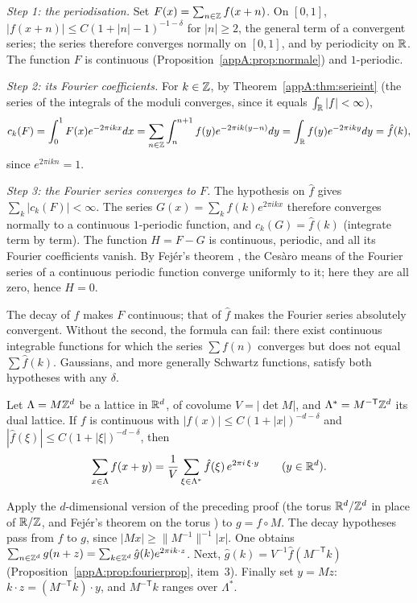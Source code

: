 \begin{humanproof}
\emph{Step 1: the periodisation.} Set $F(x)=\sum_{n\in\mathbb{Z}}f(x+n)$. On $[0,1]$, $|f(x+n)|\le C(1+|n|-1)^{-1-\delta}$
for $|n|\ge2$, the general term of a convergent series; the series therefore converges normally on $[0,1]$, and by
periodicity on $\mathbb{R}$. The function $F$ is continuous (Proposition~\ref{appA:prop:normale}) and $1$-periodic.

\emph{Step 2: its Fourier coefficients.} For $k\in\mathbb{Z}$, by Theorem~\ref{appA:thm:serieint} (the series of the
integrals of the moduli converges, since it equals $\int_{\mathbb{R}}|f|<\infty$),
\[c_k(F)=\int_0^1F(x)e^{-2\pi ikx}dx=\sum_{n\in\mathbb{Z}}\int_n^{n+1}f(y)e^{-2\pi ik(y-n)}dy=\int_{\mathbb{R}} f(y)e^{-2\pi iky}dy=\hat
f(k),\]
since $e^{2\pi ikn}=1$.

\emph{Step 3: the Fourier series converges to $F$.} The hypothesis on $\hat f$ gives $\sum_k|c_k(F)|<\infty$. The series
$G(x)=\sum_k\hat f(k)e^{2\pi ikx}$ therefore converges normally to a continuous $1$-periodic function, and
$c_k(G)=\hat f(k)$ (integrate term by term). The function $H=F-G$ is continuous, periodic, and all its Fourier
coefficients vanish. By Fejér's theorem \tierL, the Cesàro means of the Fourier series of a continuous periodic
function converge uniformly to it; here they are all zero, hence $H=0$.
\end{humanproof}

\begin{remark}
The decay of $f$ makes $F$ continuous; that of $\hat f$ makes the Fourier series absolutely convergent. Without the
second, the formula can fail: there exist continuous integrable functions for which the series $\sum f(n)$
converges but does not equal $\sum\hat f(k)$. Gaussians, and more generally Schwartz functions, satisfy
both hypotheses with any $\delta$.
\end{remark}

\begin{theorem}\label{appA:thm:poissonres}
Let $\Lambda=M\mathbb{Z}^d$ be a lattice in $\mathbb{R}^d$, of covolume $V=|\det M|$, and $\Lambda^*=M^{-\mathsf T}\mathbb{Z}^d$ its dual lattice.
If $f$ is continuous with $|f(x)|\le C(1+|x|)^{-d-\delta}$ and $|\hat f(\xi)|\le C(1+|\xi|)^{-d-\delta}$, then
\[\sum_{x\in\Lambda}f(x+y)=\frac1V\sum_{\xi\in\Lambda^*}\hat f(\xi)\,e^{2\pi i\,\xi\cdot y}\qquad(y\in\mathbb{R}^d).\]
\end{theorem}

\begin{humanproof}
Apply the $d$-dimensional version of the preceding proof (the torus $\mathbb{R}^d/\mathbb{Z}^d$ in place of
$\mathbb{R}/\mathbb{Z}$, and Fejér's theorem on the torus \tierL) to $g=f\circ M$. The decay hypotheses pass from $f$ to $g$,
since $|Mx|\ge\|M^{-1}\|^{-1}|x|$. One obtains $\sum_{n\in\mathbb{Z}^d}g(n+z)=\sum_{k\in\mathbb{Z}^d}\hat g(k)e^{2\pi ik\cdot z}$. Next,
$\hat g(k)=V^{-1}\hat f(M^{-\mathsf T}k)$ (Proposition~\ref{appA:prop:fourierprop}, item~3). Finally set $y=Mz$:
$k\cdot z=(M^{-\mathsf T}k)\cdot y$, and $M^{-\mathsf T}k$ ranges over $\Lambda^*$.
\end{humanproof}

